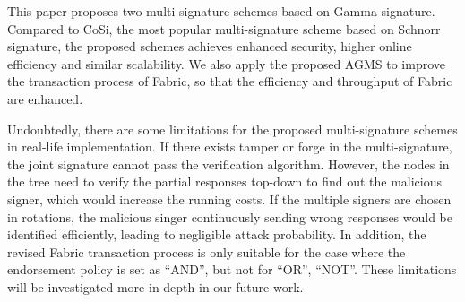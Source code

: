 \documentclass[journal]{IEEEtran}
\begin{document}
This paper proposes two multi-signature schemes based on Gamma signature. Compared to CoSi, the most popular multi-signature scheme based on Schnorr signature, the proposed schemes achieves enhanced security, higher online efficiency and similar scalability. We also apply the proposed AGMS to improve the transaction process of Fabric, so that the efficiency and throughput of Fabric are enhanced.

Undoubtedly, there are some limitations for the proposed multi-signature schemes in real-life implementation. If there exists tamper or forge in the multi-signature, the joint signature cannot pass the verification algorithm. However, the nodes in the tree need to verify the partial responses top-down to find out the malicious signer, which would increase the running costs. If the multiple signers are chosen in rotations, the malicious singer continuously sending wrong responses would be identified efficiently, leading to negligible attack probability. In addition, the revised Fabric transaction process is only suitable for the case where the endorsement policy is set as ``AND'', but not for ``OR'', ``NOT''. These limitations will be investigated more in-depth in our future work.

\end{document}
